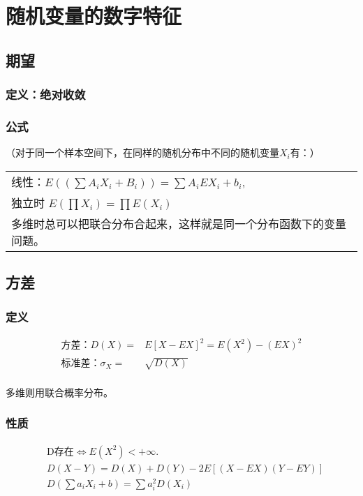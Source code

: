 \documentclass[a4paper]{ctexart}
\begin{document}
\section{随机变量的数字特征}
\subsection{期望}
\subsubsection{定义：绝对收敛}
\subsubsection{公式}
（对于同一个样本空间下，在同样的随机分布中不同的随机变量$X_i$有：）
\begin{tabular}{l}
    线性：$E((\sum A_iX_i+B_i))=\displaystyle\sum A_iEX_i+b_i$, \\
    独立时 $E(\prod X_i)=\displaystyle\prod E(X_i)$             \\
    多维时总可以把联合分布合起来，这样就是同一个分布函数下的变量问题。
\end{tabular}
\subsection{方差}
\subsubsection{定义}
\begin{equation*}
    \begin{aligned}
        \text{方差：}D(X)=        & E[X-EX]^2=E(X^2)-(EX)^2 \\
        \text{标准差：} \sigma_X= & \sqrt{D(X)}             \\
    \end{aligned}
\end{equation*}

{\small 多维则用联合概率分布。}
\subsubsection{性质}
\begin{equation*}
    \begin{aligned}
         & \text{D存在} \Longleftrightarrow E(X^2)<+\infty. \\
         & D(X-Y)=D(X)+D(Y)-2E[(X-EX)(Y-EY)]                \\
         & D(\sum a_i X_i+b)=\sum a_i^2 D(X_i)
    \end{aligned}
\end{equation*}
\end{document}
